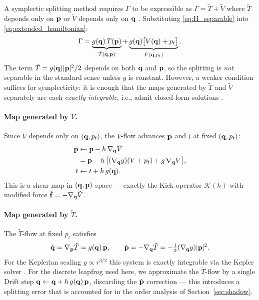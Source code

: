 A symplectic splitting method requires $\Gamma$ to be expressible
as $\Gamma = \tilde{T} + \tilde{V}$ where $\tilde{T}$ depends
only on $\mathbf{p}$ or $\tilde{V}$ depends only on $\mathbf{q}$ \cite{Wang2024tts,Wu2024adaptive}.
Substituting \eqref{eq:H_separable} into
\eqref{eq:extended_hamiltonian}:
\begin{equation}
  \Gamma = \underbrace{g(\mathbf{q})\,T(\mathbf{p})}_{\tilde{T}(\mathbf{q},\mathbf{p})}
         + \underbrace{g(\mathbf{q})\bigl[V(\mathbf{q}) + p_t\bigr]}_{\tilde{V}(\mathbf{q},p_t)}.
  \label{eq:Gamma_split}
\end{equation}
The term $\tilde{T} = g(\mathbf{q})|\mathbf{p}|^2/2$ depends on both $\mathbf{q}$
and $\mathbf{p}$, so the splitting is \textit{not} separable in the
standard sense unless $g$ is constant.
However, a weaker condition suffices for symplecticity: it is
enough that the maps generated by $\tilde{T}$ and $\tilde{V}$
separately are each \textit{exactly integrable}, i.e., admit
closed-form solutions \citep{BlanesIserles2012}.

\paragraph{Map generated by $\tilde{V}$.}
Since $\tilde{V}$ depends only on $(\mathbf{q}, p_t)$, the
$\tilde{V}$-flow advances $\mathbf{p}$ and $t$ at fixed $(\mathbf{q}, p_t)$:
\begin{equation}
  \begin{aligned}[t]
    \mathbf{p} &\leftarrow \mathbf{p} - h\,\nabla_{\mathbf{q}} \tilde{V} \\
        &= \mathbf{p} - h\,\bigl[(\nabla_{\mathbf{q}} g)(V + p_t)
                         + g\,\nabla_{\mathbf{q}} V\bigr], \\
    t &\leftarrow t + h\,g(\mathbf{q}).
  \end{aligned}
  \label{eq:V_flow}
\end{equation}
This is a shear map in $(\mathbf{q},\mathbf{p})$ space — exactly the Kick
operator $\mathcal{K}(h)$ with modified force
$\tilde{\mathbf{f}} = -\nabla_{\mathbf{q}}\tilde{V}$.

\paragraph{Map generated by $\tilde{T}$.}
The $\tilde{T}$-flow at fixed $p_t$ satisfies
\begin{equation}
  \dot{\mathbf{q}} = \nabla_{\mathbf{p}} \tilde{T} = g(\mathbf{q})\,\mathbf{p},
  \qquad
  \dot{\mathbf{p}} = -\nabla_{\mathbf{q}} \tilde{T}
            = -\tfrac{1}{2}(\nabla_{\mathbf{q}} g)|\mathbf{p}|^2.
  \label{eq:T_flow_ode}
\end{equation}
For the Keplerian scaling $g \propto r^{3/2}$ this system is
exactly integrable via the Kepler solver \citep{BlanesIserles2012}.
For the discrete leapfrog used here, we approximate the
$\tilde{T}$-flow by a single Drift step
$\mathbf{q} \leftarrow \mathbf{q} + h\,g(\mathbf{q})\,\mathbf{p}$, discarding the
$\dot{\mathbf{p}}$ correction — this introduces a splitting error that
is accounted for in the order analysis of
Section~\ref{sec:shadow}.
